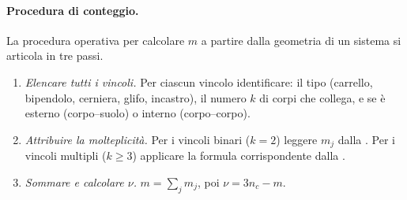 \paragraph{Procedura di conteggio.}
La procedura operativa per calcolare $m$ a partire dalla
geometria di un sistema si articola in tre passi.

\begin{enumerate}[label=(\arabic*), leftmargin=*, itemsep=4pt]
	\item \emph{Elencare tutti i vincoli.} Per ciascun
	vincolo identificare: il tipo (carrello, bipendolo,
	cerniera, glifo, incastro), il numero $k$ di corpi che
	collega, e se è esterno (corpo--suolo) o interno
	(corpo--corpo).
	
	\item \emph{Attribuire la molteplicità.} Per i vincoli
	binari ($k = 2$) leggere $m_j$ dalla
	. Per i vincoli multipli
	($k \geq 3$) applicare la formula corrispondente dalla
	.
	
	\item \emph{Sommare e calcolare $\nu$.}
	$m = \sum_j m_j$, poi $\nu = 3n_c - m$.
\end{enumerate}




